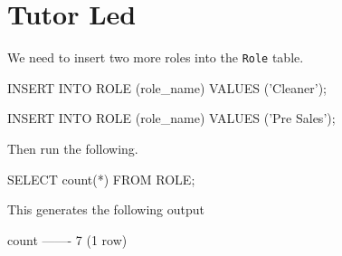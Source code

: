 
\section*{Tutor Led}
We need to insert two more roles into the \texttt{Role} table.
\begin{sql}
INSERT INTO ROLE (role_name)
VALUES ('Cleaner');

INSERT INTO ROLE (role_name)
VALUES ('Pre Sales');
\end{sql}
Then run the following.
\begin{sql}
SELECT count(*)
FROM ROLE;
\end{sql}
This generates the following output
\begin{pseudo*}
 count 
-------
     7
(1 row)
\end{pseudo*}

